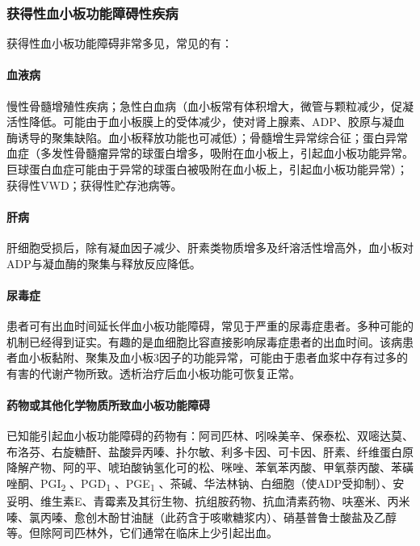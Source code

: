 \subsubsection{获得性血小板功能障碍性疾病}

获得性血小板功能障碍非常多见，常见的有：

\paragraph{血液病}

慢性骨髓增殖性疾病；急性白血病（血小板常有体积增大，微管与颗粒减少，促凝活性降低。可能由于血小板膜上的受体减少，使对肾上腺素、ADP、胶原与凝血酶诱导的聚集缺陷。血小板释放功能也可减低）；骨髓增生异常综合征；蛋白异常血症（多发性骨髓瘤异常的球蛋白增多，吸附在血小板上，引起血小板功能异常。巨球蛋白血症可能由于异常的球蛋白被吸附在血小板上，引起血小板功能异常）；获得性VWD；获得性贮存池病等。

\paragraph{肝病}

肝细胞受损后，除有凝血因子减少、肝素类物质增多及纤溶活性增高外，血小板对ADP与凝血酶的聚集与释放反应降低。

\paragraph{尿毒症}

患者可有出血时间延长伴血小板功能障碍，常见于严重的尿毒症患者。多种可能的机制已经得到证实。有趣的是血细胞比容直接影响尿毒症患者的出血时间。该病患者血小板黏附、聚集及血小板3因子的功能异常，可能由于患者血浆中存有过多的有害的代谢产物所致。透析治疗后血小板功能可恢复正常。

\paragraph{药物或其他化学物质所致血小板功能障碍}

已知能引起血小板功能障碍的药物有：阿司匹林、吲哚美辛、保泰松、双嘧达莫、布洛芬、右旋糖酐、盐酸异丙嗪、扑尔敏、利多卡因、可卡因、肝素、纤维蛋白原降解产物、阿的平、唬珀酸钠氢化可的松、咪唑、苯氧苯丙酸、甲氧萘丙酸、苯磺唑酮、PGI\textsubscript{2}
、PGD\textsubscript{1} 、PGE\textsubscript{1}
、茶碱、华法林钠、白细胞（使ADP受抑制）、安妥明、维生素E、青霉素及其衍生物、抗组胺药物、抗血清素药物、呋塞米、丙米嗪、氯丙嗪、愈创木酚甘油醚（此药含于咳嗽糖浆内）、硝基普鲁士酸盐及乙醇等。但除阿司匹林外，它们通常在临床上少引起出血。

